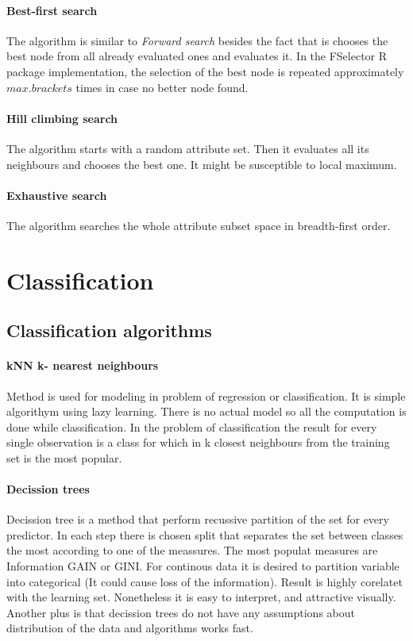 \documentclass[10pt]{article}\usepackage[]{graphicx}\usepackage[]{color}
\begin{document}
\paragraph{Best-first search}
The algorithm is similar to \textit{Forward search} besides the fact that is chooses the best node from all already evaluated ones and evaluates it. In the FSelector R package implementation, the selection of the best node is repeated approximately $max.brackets$ times in case no better node found. 

\paragraph{Hill climbing search}
The algorithm starts with a random attribute set. Then it evaluates all its neighbours and chooses the best one. It might be susceptible to local maximum.

\paragraph{Exhaustive search}
The algorithm searches the whole attribute subset space in breadth-first order. 







\clearpage
\section{Classification}

\subsection{Classification algorithms}

\paragraph{kNN k- nearest neighbours}
Method is used for modeling in problem of regression or classification. 
It is simple algorithym using lazy learning. There is no actual model so all the 
computation is done while classification. 
In the problem of classification the result for every single observation is 
a class for which in k closest neighbours from the training set is the most
popular.
\paragraph{Decission trees}
Decission tree is a method that perform recussive partition of the set for every
predictor. In each step there is chosen split that separates the set between 
classes the most according to one of the meassures. The most populat measures 
are Information GAIN or GINI.
For continous data it is desired to partition variable into categorical 
(It could cause loss of the information). Result is highly corelatet with the 
learning set. Nonetheless it is easy to interpret, and attractive visually. 
Another plus is that decission trees do not have any assumptions about 
distribution of the data and algorithms works fast. 
\end{document}
